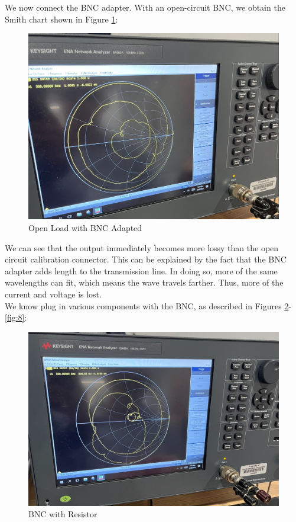 \documentclass[
	letterpaper, %
	10pt, %
]{CSUniSchoolLabReport}
\begin{document}
We now connect the BNC adapter. With an open-circuit BNC, we obtain the Smith chart shown in Figure \ref{fig:5}:

\begin{figure}[H]
  \centering
  \includegraphics[width=.75\textwidth]{Figures/Lab One/OpenBNC.png}
  \caption{Open Load with BNC Adapted}
  \label{fig:5}
\end{figure}

We can see that the output immediately becomes more lossy than the open circuit calibration connector. This can be explained by the fact that the BNC adapter adds length to the transmission line. In doing so, more of the same wavelengths can fit, which means the wave travels farther. Thus, more of the current and voltage is lost.\\

We know plug in various components with the BNC, as described in Figures \ref{fig:6}-\ref{fig:8}:

\begin{figure}[H]
  \centering
  \includegraphics[width=.75\textwidth]{Figures/Lab One/ResistorBNC.png}
  \caption{BNC with Resistor}
  \label{fig:6}
\end{figure}
\end{document}
